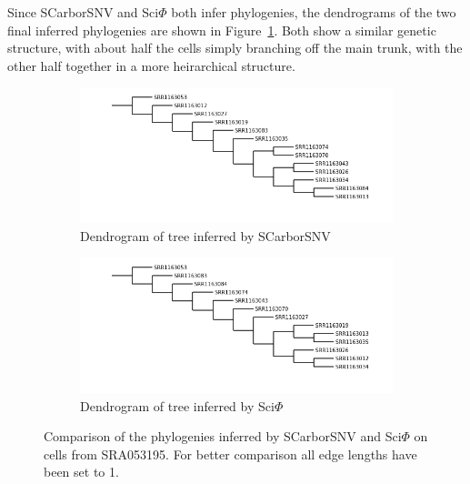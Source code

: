 \documentclass[../../main.tex]{subfiles}
\begin{document}
Since SCarborSNV and Sci$\Phi$ both infer phylogenies, the dendrograms of the two final inferred phylogenies are shown in Figure~\ref{fig:dendrograms}.
Both show a similar genetic structure, with about half the cells simply branching off the main trunk, with the other half together in a more heirarchical structure.

\begin{figure}[h]
    \centering
    \begin{subfigure}[b]{0.9\textwidth}
        \centering
        \includegraphics[width=\textwidth]{sections/graphics/SCarbor32_dendro}
        \caption{Dendrogram of tree inferred by SCarborSNV}
    \end{subfigure}
    \begin{subfigure}[b]{0.9\textwidth}
        \centering
        \includegraphics[width=\textwidth]{sections/graphics/SCIPHI32_dendro}
        \caption{Dendrogram of tree inferred by Sci$\Phi$}
    \end{subfigure}
    \caption{Comparison of the phylogenies inferred by SCarborSNV and Sci$\Phi$ on cells from SRA053195. For better comparison all edge lengths have been set to 1.}
    \label{fig:dendrograms}
\end{figure}
\end{document}
